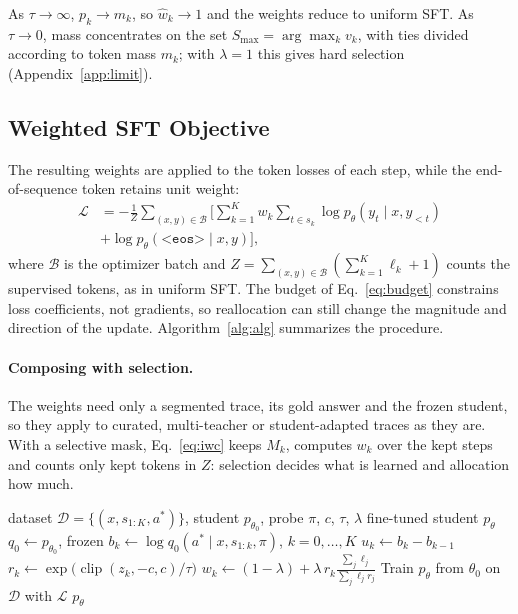As $\tau\to\infty$, $p_k\to m_k$, so $\hat w_k\to1$ and the weights reduce to uniform SFT. As $\tau\to0$, mass concentrates on the set $S_{\max}=\arg\max_k v_k$, with ties divided according to token mass $m_k$; with $\lambda=1$ this gives hard selection (Appendix~\ref{app:limit}).

\subsection{Weighted SFT Objective}
\label{sec:objective}
The resulting weights are applied to the token losses of each step, while the end-of-sequence token retains unit weight:
\begin{equation}
\begin{split}
\mathcal{L} &=
-\frac{1}{Z}
\sum_{(x,y)\in\mathcal{B}}
\Bigg[
\sum_{k=1}^{K}
w_k
\sum_{t\in s_k}
\log p_\theta(y_t\mid x,y_{<t}) \\
&+
\log p_\theta(\texttt{<eos>}\mid x,y)
\Bigg],
\end{split}
\label{eq:loss}
\end{equation}
where $\mathcal{B}$ is the optimizer batch and $Z = \sum_{(x,y)\in\mathcal{B}} \left( \sum_{k=1}^{K}\ell_k+1 \right)$ counts the supervised tokens, as in uniform SFT.
The budget of Eq.~\ref{eq:budget} constrains loss coefficients, not gradients, so reallocation can still change the magnitude and direction of the update.
Algorithm~\ref{alg:alg} summarizes the procedure.

\paragraph{Composing with selection.}
\label{sec:compose}
The weights need only a segmented trace, its gold answer and the frozen student, so they apply to curated, multi-teacher or student-adapted traces as they are. With a selective mask, Eq.~\ref{eq:iwc} keeps $M_k$, computes $w_k$ over the kept steps and counts only kept tokens in $Z$: selection decides what is learned and allocation how much.

\begin{algorithm}[t]
\caption{Answer-gain allocation}
\label{alg:alg}
\small
\begin{algorithmic}[1]
\Require dataset $\mathcal{D}=\{(x,s_{1:K},a^*)\}$, student $p_{\theta_0}$, probe $\pi$, $c$, $\tau$, $\lambda$
\Ensure fine-tuned student $p_\theta$
\State $q_0\gets p_{\theta_0}$, frozen
 
  \State $b_k\gets\log q_0(a^*\mid x,s_{1:k},\pi)$, $k=0,\dots,K$
  \State $u_k\gets b_k-b_{k-1}$ 
  \State $r_k\gets\exp\!\big(\operatorname{clip}(z_k,-c,c)/\tau\big)$ 
  \State $w_k\gets(1-\lambda)+\lambda\, r_k\frac{\sum_j\ell_j}{\sum_j\ell_jr_j}$ 
\EndFor
\State Train $p_\theta$ from $\theta_0$ on $\mathcal{D}$ with $\mathcal{L}$ 
\State \Return $p_\theta$
\end{algorithmic}
\end{algorithm}
